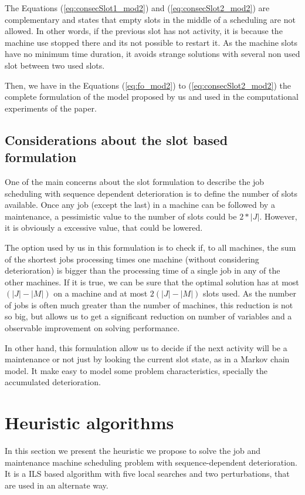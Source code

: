 \documentclass[a4paper,11pt]{article}
\begin{document}
The Equations (\ref{eq:consecSlot1_mod2}) and (\ref{eq:consecSlot2_mod2}) are complementary and states that empty slots in the middle of a scheduling are not allowed. In other words, if the previous slot has not activity, it is because the machine use stopped there and its not possible to restart it. As the machine slots have no minimum time duration, it avoids strange solutions with several non used slot between two used slots. 

Then, we have in the Equations (\ref{eq:fo_mod2}) to (\ref{eq:consecSlot2_mod2}) the complete formulation of the model proposed by us and used in the computational experiments of the paper. 



\subsection{Considerations about the slot based formulation}
One of the main concerns about the slot formulation to describe the job scheduling with sequence dependent deterioration is to define the number of slots available. Once any job (except the last) in a machine can be followed by a maintenance, a pessimistic value to the number of slots could be $2*|J|$. However, it is obviously a excessive value, that could be lowered. 

The option used by us in this formulation is to check if, to all machines, the sum of the shortest jobs processing times one machine (without considering deterioration) is bigger than the processing time of a single job in any of the other machines. If it is true, we can be sure that the optimal solution has at most $(|J| - |M|)$ on a machine and at most $2(|J| - |M|)$ slots used. As the number of jobs is often much greater than the number of machines, this reduction is not so big, but allows us to get a significant reduction on number of variables and a observable improvement on solving performance.  

In other hand, this formulation allow us to decide if the next activity will be a maintenance or not just by looking the current slot state, as in a Markov chain model. It make easy to model some problem characteristics, specially the accumulated deterioration. 

\section{Heuristic algorithms}

In this section we present the heuristic we propose to solve the job and maintenance machine scheduling problem with sequence-dependent deterioration. It is a ILS based algorithm with five local searches and two perturbations, that are used in an alternate way.  
\end{document}
